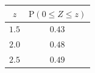 {\setlength{\tabcolsep}{5pt}\renewcommand{\arraystretch}{1.25}%
\begin{tabular}{|c|c|}
\hline
$z$ & $\mathrm{P}(0\le Z\le z)$ \\
\hline
$1.5$ & $0.43$ \\
\hline
$2.0$ & $0.48$ \\
\hline
$2.5$ & $0.49$ \\
\hline
\end{tabular}}
